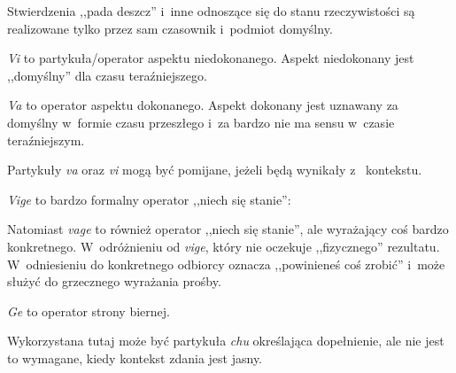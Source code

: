 \begin{spacing}{1.1}
Stwierdzenia ,,pada deszcz'' i~inne odnoszące się do stanu rzeczywistości są 
realizowane tylko przez sam czasownik i~podmiot domyślny.



\emph{Vi} to partykuła/operator aspektu niedokonanego. Aspekt niedokonany jest 
,,domyślny'' dla czasu teraźniejszego.




\emph{Va} to operator aspektu dokonanego. Aspekt dokonany jest uznawany za 
domyślny w~formie czasu przeszłego i~za bardzo nie ma sensu w~czasie 
teraźniejszym.




Partykuły \emph{va} oraz \emph{vi} mogą być pomijane, jeżeli będą wynikały z~
kontekstu.

\emph{Vige} to bardzo formalny operator ,,niech się stanie'':


Natomiast \emph{vage} to również operator ,,niech się stanie'', ale wyrażający coś
bardzo konkretnego. W~odróżnieniu od \emph{vige}, który nie oczekuje 
,,fizycznego'' rezultatu. W~odniesieniu do konkretnego odbiorcy oznacza 
,,powinieneś coś zrobić'' i~może służyć do grzecznego wyrażania prośby.




\emph{Ge} to operator strony biernej.


Wykorzystana tutaj może być partykuła \emph{chu} określająca dopełnienie, ale 
nie jest to wymagane, kiedy kontekst zdania jest jasny.


\end{spacing}
